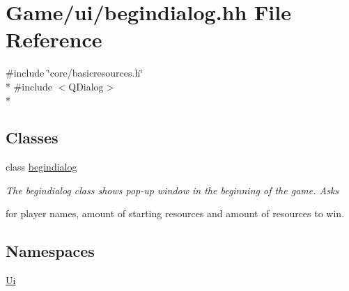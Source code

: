 \hypertarget{begindialog_8hh}{\section{Game/ui/begindialog.hh File Reference}
\label{begindialog_8hh}
}
{\ttfamily \#include \char`\"{}core/basicresources.\-h\char`\"{}}\\*
{\ttfamily \#include $<$Q\-Dialog$>$}\\*
\subsection*{Classes}
\begin{DoxyCompactItemize}
\item 
class \hyperlink{classbegindialog}{begindialog}
\begin{DoxyCompactList}\small\item\em The begindialog class shows pop-\/up window in the beginning of the game. Asks \par
for player names, amount of starting resources and amount of resources to win. \end{DoxyCompactList}\end{DoxyCompactItemize}
\subsection*{Namespaces}
\begin{DoxyCompactItemize}
\item 
\hyperlink{namespaceUi}{Ui}
\end{DoxyCompactItemize}
